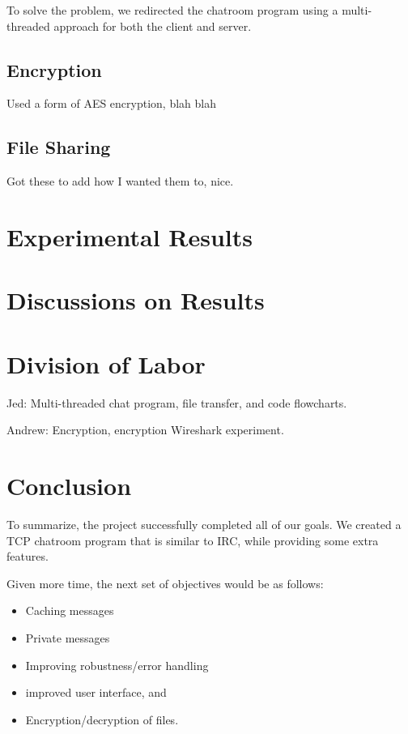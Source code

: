 \documentclass{article}
\begin{document}
To solve the problem, we redirected the chatroom program using a multi-threaded approach for both the client and server.

\subsection{Encryption}

Used a form of AES encryption, blah blah

\subsection{File Sharing}

Got these to add how I wanted them to, nice. 

\section{Experimental Results}

\section{Discussions on Results}

\section{Division of Labor}

Jed: Multi-threaded chat program, file transfer, and code flowcharts. 

Andrew: Encryption, encryption Wireshark experiment. 

\section{Conclusion}

To summarize, the project successfully completed all of our goals. We created a TCP chatroom program that is similar to IRC, while providing some extra features. 

Given more time, the next set of objectives would be as follows: 
\begin{itemize}
  \item Caching messages
  \item Private messages
  \item Improving robustness/error handling
  \item improved user interface, and
  \item Encryption/decryption of files. 
\end{itemize}
\end{document}
